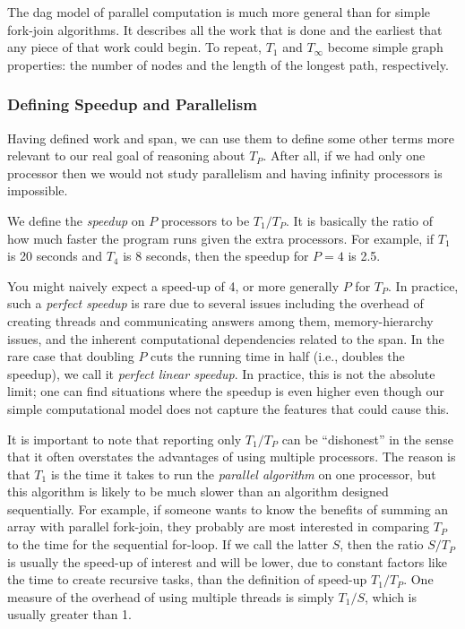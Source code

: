 \documentclass[10pt]{article}
\begin{document}
The dag model of parallel computation is much more general than for
simple fork-join algorithms.  It describes all the work that is done
and the earliest that any piece of that work could begin.  To repeat,
$T_1$ and $T_\infty$ become simple graph properties: the number of
nodes and the length of the longest path, respectively.

\subsubsection{Defining Speedup and Parallelism}

Having defined work and span, we can use them to define some other
terms more relevant to our real goal of reasoning about $T_P$.  After
all, if we had only one processor then we would not study parallelism
and having infinity processors is impossible.

We define the \emph{speedup} on $P$ processors to be $T_1/T_P$.  It is
basically the ratio of how much faster the program runs given the
extra processors.  For example, if $T_1$ is 20 seconds and $T_4$ is 8
seconds, then the speedup for $P=4$ is 2.5.  

You might naively expect a speed-up of 4, or more generally $P$ for
$T_P$.  In practice, such a \emph{perfect speedup} is rare due to
several issues including the overhead of creating threads and
communicating answers among them, memory-hierarchy issues, and the
inherent computational dependencies related to the span.  In the rare
case that doubling $P$ cuts the running time in half (i.e., doubles
the speedup), we call it \emph{perfect linear speedup}.  In practice,
this is not the absolute limit; one can find situations
where the speedup is even higher even though our simple computational
model does not capture the features that could cause this.  

It is important to note that reporting only $T_1/T_P$ can be
``dishonest'' in the sense that it often overstates the advantages of
using multiple processors.  The reason is that $T_1$ is the time it
takes to run the \emph{parallel algorithm} on one processor, but this
algorithm is likely to be much slower than an algorithm designed
sequentially.  For example, if someone wants to know the benefits of
summing an array with parallel fork-join, they probably are most
interested in comparing $T_P$ to the time for the sequential for-loop.
If we call the latter $S$, then the ratio $S/T_P$ is usually the
speed-up of interest and will be lower, due to constant factors like
the time to create recursive tasks, than the definition of speed-up
$T_1/T_P$.  One measure of the overhead of using multiple threads is
simply $T_1/S$, which is usually greater than 1.
\end{document}
